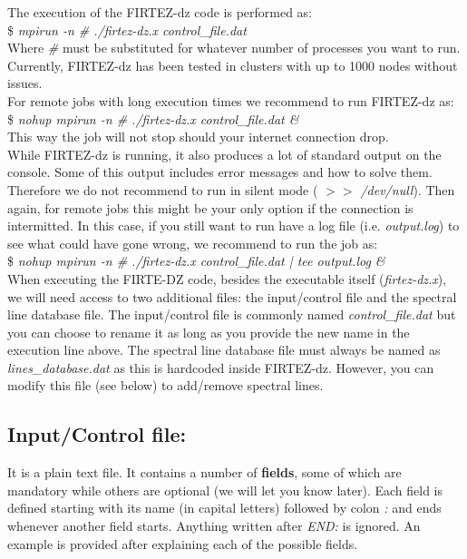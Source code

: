 %
\label{sect:execution}
%
The execution of the FIRTEZ-dz code is performed as:\\

\$ {\it mpirun -n \# ./firtez-dz.x control\_file.dat}\\

Where {\it \#} must be substituted for whatever number of processes you want to run. Currently, FIRTEZ-dz has been tested in clusters with up to 1000 nodes without issues.\\

For remote jobs with long execution times we recommend to run FIRTEZ-dz as:\\

\$ {\it nohup mpirun -n \# ./firtez-dz.x control\_file.dat \&}\\

This way the job will not stop should your internet connection drop.\\

While FIRTEZ-dz is running, it also produces a lot of standard output on the console. Some of this output includes error messages and how to solve them. Therefore we do not recommend to run in silent mode ( {\it $>>$ /dev/null}). Then again, for remote jobs this might be your only option if the connection is intermitted. In this case, if you still want to run have a log file (i.e. {\it output.log}) to see what could have gone wrong, we recommend to run the job as:\\

\$ {\it nohup mpirun -n \# ./firtez-dz.x control\_file.dat | tee output.log \&}\\

When executing the FIRTE-DZ code, besides the executable itself ({\it firtez-dz.x}), we will need access to two additional files: the input/control file and the spectral line database file. The input/control file is commonly named {\it control\_file.dat} but you can choose to rename it as long as you provide the new name in the execution line above. The spectral line database file must always be named as {\it lines\_database.dat} as this is hardcoded inside FIRTEZ-dz. However, you can modify this file (see below) to add/remove spectral lines.

%
\subsection{Input/Control file:}
It is a plain text file. It contains a number of {\bf fields}, some of which are mandatory while others are optional (we will let you know later). Each field is defined starting with its name (in capital letters) followed by colon {\it :} and ends whenever another field starts. Anything written after {\it END:} is ignored. An example is provided after explaining each of the possible fields.\\

